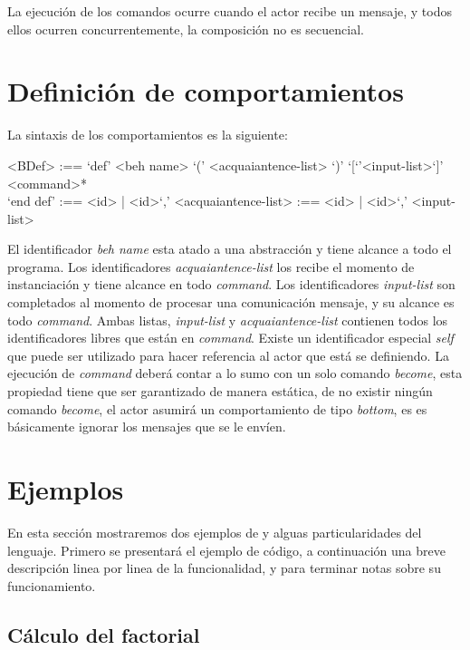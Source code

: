 La ejecución de los comandos ocurre cuando el actor recibe un mensaje, y todos
ellos ocurren concurrentemente, la composición no es secuencial.

\section{Definición de comportamientos}

La sintaxis de los comportamientos es la siguiente:

\begin{grammar}
 <BDef> :== `def' <beh name> `(' <acquaiantence-list> `)' `[`'<input-list>`]' \\
  \quad <command>* \\
  `end def'
   :== <id> | <id>`,' <acquaiantence-list>
   :== <id> | <id>`,' <input-list>
\end{grammar}

El identificador \textit{beh name} esta atado a una abstracción y tiene alcance
a todo el programa. Los identificadores \textit{acquaiantence-list} los recibe el
momento de instanciación y tiene alcance en todo \textit{command}. Los
identificadores \textit{input-list} son completados al momento de procesar una comunicación
mensaje, y su alcance es todo \textit{command}. 
Ambas listas, \textit{input-list} y \textit{acquaiantence-list} contienen todos
los identificadores libres que están en \textit{command}. Existe un
identificador especial \textit{self} que puede ser utilizado para hacer
referencia al actor que está se definiendo. 
La ejecución de \textit{command} deberá contar a lo sumo con un solo comando
\textit{become}, esta propiedad tiene que ser garantizado de manera estática, de no
existir ningún comando \textit{become}, el actor asumirá un comportamiento de
tipo \textit{bottom}, es es básicamente ignorar los mensajes que se le envíen.

\section{Ejemplos}

En esta sección mostraremos dos ejemplos de \SAL y alguas particularidades del lenguaje. 
Primero se presentará el ejemplo de código, a continuación una breve descripción linea por linea de la funcionalidad, 
y para terminar notas sobre su funcionamiento.

\subsection{Cálculo del factorial}

